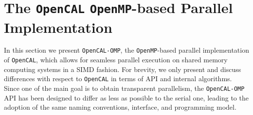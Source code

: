 \section{The \texttt{OpenCAL} \texttt{OpenMP}-based Parallel Implementation}
\label{sec:OpenCAL-OMP}

In this section we present \texttt{OpenCAL-OMP}, the \texttt{OpenMP}-based parallel
implementation of \texttt{OpenCAL}, which allows for seamless parallel execution on
shared memory computing systems in a SIMD fashion. For brevity, we
only present and discuss differences with respect to \texttt{OpenCAL} in
terms of API and internal algorithms.
Since one of the main goal is to obtain transparent parallelism, the \texttt{OpenCAL-OMP} API has been designed to differ as less as possible to the serial
one, leading to the adoption of the same naming conventions, interface,
and programming model.

